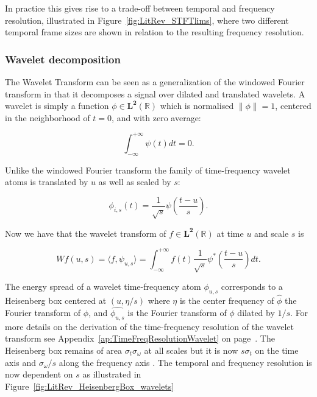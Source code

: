 In practice this gives rise to a trade-off between temporal and frequency resolution, illustrated in Figure~\ref{fig:LitRev_STFTlims}, where two different temporal frame sizes are shown in relation to the resulting frequency resolution.

\subsubsection{Wavelet decomposition}
The Wavelet Transform can be seen as a generalization of the windowed Fourier transform in that it decomposes a signal over dilated and translated wavelets. A wavelet is simply a function $\phi \in \mathbf{L^2}(\mathbb{R})$ which is normalised $\| \phi \| = 1$, centered in the neighborhood of $t=0$, and with zero average:

\begin{equation}\label{eq:Mallat1999_4}
\int^{+\infty}_{-\infty} \psi(t) dt = 0.
\end{equation}

Unlike the windowed Fourier transform the family of time-frequency wavelet atoms is translated by $u$ as well as scaled by $s$:

\begin{equation}\label{eq:Mallat1999_5}
\phi_{i,s}(t) = \frac{1}{\sqrt{s}}\psi\left(\frac{t-u}{s}\right).
\end{equation}

Now we have that the wavelet transform of $f \in \mathbf{L^2}(\mathbb{R})$ at time $u$ and scale $s$ is

\begin{equation}\label{eq:Mallat1999_x}
W f(u,s) = \langle f, \psi_{u,s} \rangle = \int^{+\infty}_{-\infty} f(t) \frac{1}{\sqrt{s}}\psi^\ast \left( \frac{t-u}{s} \right) dt.
\end{equation}

The energy spread of a wavelet time-frequency atom $\phi_{u,s}$ corresponds to a Heisenberg box centered at $(u,\eta/s)$ where $\eta$ is the center frequency of $\hat{\phi}$ the Fourier transform of $\phi$, and $\hat{\phi_{u,s}}$ is the Fourier transform of $\phi$ dilated by $1/s$. For more details on the derivation of the time-frequency resolution of the wavelet transform see Appendix~\ref{ap:TimeFreqResolutionWavelet} on page~\pageref{ap:TimeFreqResolutionWavelet}. The Heisenberg box remains of area $\sigma_t \sigma_\omega$ at all scales but it is now $s\sigma_t$ on the time axis and $\sigma_\omega /s$ along the frequency axis \cite{Mallat1999}. The temporal and frequency resolution is now dependent on $s$ as illustrated in Figure~\ref{fig:LitRev_HeisenbergBox_wavelets}

